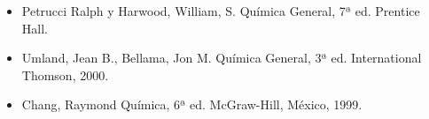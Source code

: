 \documentclass{article}
\begin{document}
\begin{itemize}

\item Petrucci Ralph y Harwood, William, S. Química General, 7ª ed. Prentice Hall.
\item Umland, Jean B., Bellama, Jon M. Química General, 3ª ed. International Thomson, 2000.
\item Chang, Raymond Química, 6ª ed. McGraw-Hill, México, 1999.

\end{itemize}

 
\end{document}

